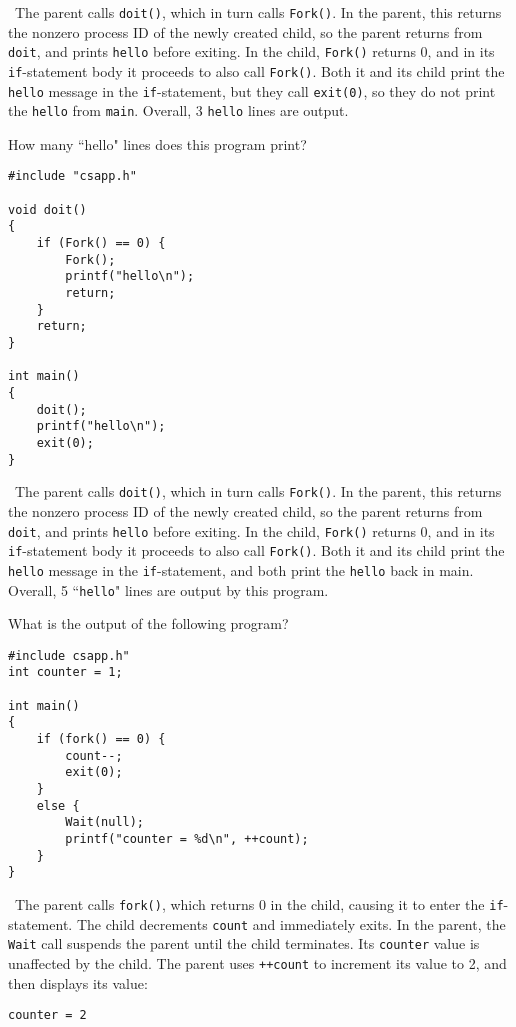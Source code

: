 \documentclass[12pt]{article}
\newenvironment{ex}[2][Exercise]{\begin{trivlist}
		\item[\hskip \labelsep {\bfseries #1}\hskip \labelsep {\bfseries #2.}]}{\end{trivlist}}
\newenvironment{sol}[1][Solution]{\begin{trivlist}
		\item[\hskip \labelsep {\bfseries #1:}]}{\end{trivlist}}
\begin{document}
\begin{sol}
	\
	The parent calls \texttt{doit()}, which in turn calls \texttt{Fork()}. In the parent, this returns
	the nonzero process ID of the newly created child, so the parent returns from \texttt{doit}, and
	prints \texttt{hello} before exiting. In the child, \texttt{Fork()} returns 0, and in its
	\texttt{if}-statement body it proceeds to also call \texttt{Fork()}. Both it and its child
	print the \texttt{hello} message in the \texttt{if}-statement, but they call \texttt{exit(0)},
	so they do not print the \texttt{hello} from \texttt{main}. Overall, 3 \texttt{hello} lines
	are output.
\end{sol}

\begin{ex}{8.15}
	How many ``hello" lines does this program print?
	\begin{lstlisting}
#include "csapp.h"

void doit()
{
	if (Fork() == 0) {
		Fork();
		printf("hello\n");
		return;
	}
	return;
}

int main()
{
	doit();
	printf("hello\n");
	exit(0);
}
	\end{lstlisting}
\end{ex}

\begin{sol}
	\
		The parent calls \texttt{doit()}, which in turn calls \texttt{Fork()}. In the parent, this returns
	the nonzero process ID of the newly created child, so the parent returns from \texttt{doit}, and
	prints \texttt{hello} before exiting. In the child, \texttt{Fork()} returns 0, and in its
	\texttt{if}-statement body it proceeds to also call \texttt{Fork()}. Both it and its child
	print the \texttt{hello} message in the \texttt{if}-statement, and both print the \texttt{hello}
	back in main. Overall, 5 ``\texttt{hello}" lines are output by this program.
\end{sol}

\begin{ex}{8.16}
	What is the output of the following program?
	\begin{lstlisting}
#include csapp.h"
int counter = 1;

int main()
{
	if (fork() == 0) {
		count--;
		exit(0);
	}
	else {
		Wait(null);
		printf("counter = %d\n", ++count);
	}
}
	\end{lstlisting}
\end{ex}

\begin{sol}
	\
	The parent calls \texttt{fork()}, which returns 0 in the child, causing it to enter
	the \texttt{if}-statement. The child decrements \texttt{count} and immediately
	exits. In the parent, the \texttt{Wait} call suspends the parent until the child terminates.
	Its \texttt{counter} value is unaffected by the child. The parent uses \texttt{++count} to increment
	its value to 2, and then displays its value:
	\begin{lstlisting}[language={}]
counter = 2
	\end{lstlisting}
\end{sol}
\end{document}
